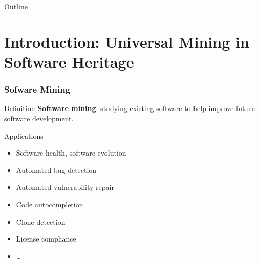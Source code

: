 \documentclass[aspectratio=169,xcolor=table]{beamer}
\begin{document}
    \maketitle

    \begin{frame}{Outline}
        \tableofcontents
    \end{frame}

    \section{Introduction: Universal Mining in Software Heritage}

    \begin{frame}
        \frametitle{Sofware Mining}

        \begin{block}{Definition}
            \textbf{Software mining}: studying existing software to help
            improve future software development.
        \end{block}

        \begin{block}{Applications}
            \begin{itemize}
                \item Software health, software evolution
                \item Automated bug detection
                \item Automated vulnerability repair
                \item Code autocompletion
                \item Clone detection
                \item License compliance
                \item …
            \end{itemize}
        \end{block}
    \end{frame}
\end{document}
